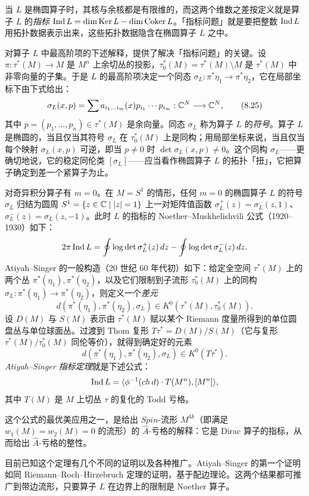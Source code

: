 当 $L$ 是椭圆算子时，其核与余核都是有限维的，而这两个维数之差按定义就是算子 $L$ 的\emph{指标} $\operatorname{Ind} L=\dim\operatorname{Ker} L-\dim\operatorname{Coker}L$。「指标问题」就是要把整数 $\operatorname{Ind} L$ 用拓扑数据表示出来，这些拓扑数据隐含在椭圆算子 $L$ 之中。

对算子 $L$ 中最高阶项的下述解释，提供了解决「指标问题」的关键。设 $\pi:\tau^*(M)\to M$ 是 $M^n$ 上余切丛的投影，$\tau_0^*(M)=\tau^*(M)\setminus M$ 是 $\tau^*(M)$ 中非零向量的子集。于是 $L$ 的最高阶项决定一个同态 $\sigma_L:\pi^*\eta_1\to\pi^*\eta_2$，它在局部坐标下由下式给出：
\begin{equation}
\sigma_L(x,p)=\sum a_{i_1\dots i_m}(x)p_{i_1}\cdots p_{i_m}:\mathbb{C}^N\longrightarrow\mathbb{C}^N, \tag{8.25}
\end{equation}
其中 $p=(p_1,\dots,p_n)\in\tau^*(M)$ 是余向量。同态 $\sigma_L$ 称为算子 $L$ 的\emph{符号}。算子 $L$ 是椭圆的，当且仅当其符号 $\sigma_L$ 在 $\tau_0^*(M)$ 上是同构；用局部坐标来说，当且仅当每个映射 $\sigma_L(x,p)$ 可逆，即当 $p\ne0$ 时 $\det\sigma_L(x,p)\ne0$。这个同构 $\sigma_L$——更确切地说，它的稳定同伦类 $[\sigma_L]$——应当看作椭圆算子 $L$ 的拓扑「扭」，它把算子确定到差一个紧算子为止。

对奇异积分算子有 $m=0$。在 $M=S^1$ 的情形，任何 $m=0$ 的椭圆算子 $L$ 的符号 $\sigma_L$ 归结为圆周 $S^1=\{z\in\mathbb{C}\mid|z|=1\}$ 上一对矩阵值函数 $\sigma_L^+(z)=\sigma_L(z,1)$、$\sigma_L^-(z)=\sigma_L(z,-1)$。此时 $L$ 的指标的 Noether--Muskhelishvili 公式（1920–1930）如下：
\[
2\pi\operatorname{Ind} L=\oint\log\det\sigma_L^+(z)\,dz-\oint\log\det\sigma_L^-(z)\,dz.
\]
Atiyah--Singer 的一般构造（20 世纪 60 年代初）如下：给定全空间 $\tau^*(M)$ 上的两个丛 $\pi^*(\eta_1),\pi^*(\eta_2)$，以及它们限制到子流形 $\tau_0^*(M)$ 上的同构 $\sigma_L:\pi^*(\eta_1)\to\pi^*(\eta_2)$，则定义一个\emph{差元}
\[
d(\pi^*(\eta_1),\pi^*(\eta_2),\sigma_L)\in K^0(\tau^*(M),\tau_0^*(M)).
\]
设 $D(M)$ 与 $S(M)$ 表示由 $\tau^*(M)$ 赋以某个 Riemann 度量所得到的单位圆盘丛与单位球面丛。过渡到 Thom 复形 $T\tau^*=D(M)/S(M)$（它与复形 $\tau^*(M)/\tau_0^*(M)$ 同伦等价），就得到确定好的元素
\[
d(\pi^*(\eta_1),\pi^*(\eta_2),\sigma_L)\in K^0(T\tau^*).
\]
\emph{Atiyah--Singer 指标定理}就是下述公式：
\[
\operatorname{Ind} L=\langle\phi^{-1}(ch\,d)\cdot T(M^n),[M^n]\rangle,
\]
其中 $T(M)$ 是 $M$ 上切丛 $\tau$ 的复化的 Todd 亏格。

这个公式的最优美应用之一，是给出 $Spin$-流形 $M^{4k}$（即满足 $w_1(M)=w_2(M)=0$ 的流形）的 $\hat A$-亏格的解释：它是 Dirac 算子的指标，从而给出 $\hat A$-亏格的整性。

目前已知这个定理有几个不同的证明以及各种推广。Atiyah--Singer 的第一个证明如同 Riemann--Roch--Hirzebruch 定理的证明，基于配边理论。这两个结果都可推广到带边流形，只要算子 $L$ 在边界上的限制是 Noether 算子。

